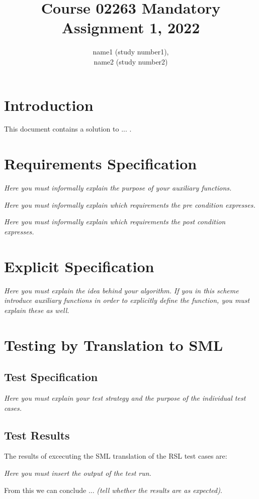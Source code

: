 \documentclass[a4]{article}
\title{Course 02263 Mandatory Assignment 1, 2022}
\author{name1 (study number1),\\ 
        name2 (study number2)}
\begin{document}
\maketitle

\tableofcontents
\newpage

\section{Introduction}
This document contains a solution to ... . 

\section{Requirements Specification}


  

{\em Here you must informally explain the purpose of your auxiliary functions.}


  

{\em Here you must informally explain which requirements the pre
  condition expresses.}

{\em Here you must informally explain which requirements the post
  condition expresses.}

\section{Explicit Specification}

  

{\em Here you must  explain the idea behind your algorithm.}
{\em If you in this scheme introduce auxiliary functions in order to explicitly
  define the function, you must explain these as well.}

\section{Testing by Translation to SML}

\subsection{Test Specification}


        
{\em Here you must  explain your test strategy and the purpose of the individual test
  cases.}


\subsection{Test Results}


The results of excecuting the SML translation of the RSL test cases are:

{\em Here you must  insert the output of the test run.}



\noindent From this we can conclude ...
{\em (tell whether the results are as expected)}.
\end{document}
